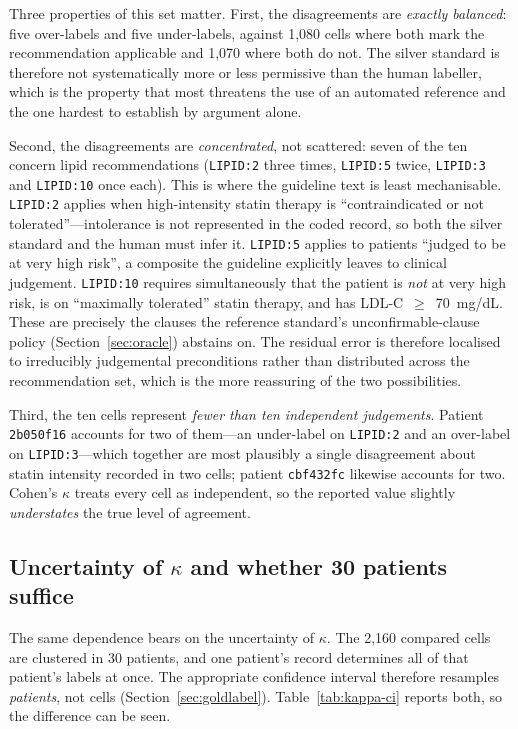 Three properties of this set matter. First, the disagreements are \emph{exactly balanced}:
five over-labels and five under-labels, against 1{,}080 cells where both mark the
recommendation applicable and 1{,}070 where both do not. The silver standard is therefore
not systematically more or less permissive than the human labeller, which is the property
that most threatens the use of an automated reference and the one hardest to establish by
argument alone.

Second, the disagreements are \emph{concentrated}, not scattered: seven of the ten concern
lipid recommendations (\texttt{LIPID:2} three times, \texttt{LIPID:5} twice,
\texttt{LIPID:3} and \texttt{LIPID:10} once each). This is where the guideline text is
least mechanisable. \texttt{LIPID:2} applies when high-intensity statin therapy is
``contraindicated or not tolerated''---intolerance is not represented in the coded record,
so both the silver standard and the human must infer it. \texttt{LIPID:5} applies to
patients ``judged to be at very high risk'', a composite the guideline explicitly leaves
to clinical judgement. \texttt{LIPID:10} requires simultaneously that the patient is
\emph{not} at very high risk, is on ``maximally tolerated'' statin therapy, and has
LDL-C~$\geq$~70~mg/dL. These are precisely the clauses the reference standard's
unconfirmable-clause policy (Section~\ref{sec:oracle}) abstains on. The residual error is
therefore localised to irreducibly judgemental preconditions rather than distributed
across the recommendation set, which is the more reassuring of the two possibilities.

Third, the ten cells represent \emph{fewer than ten independent judgements}. Patient
\texttt{2b050f16} accounts for two of them---an under-label on \texttt{LIPID:2} and an
over-label on \texttt{LIPID:3}---which together are most plausibly a single disagreement
about statin intensity recorded in two cells; patient \texttt{cbf432fc} likewise accounts
for two. Cohen's $\kappa$ treats every cell as independent, so the reported value slightly
\emph{understates} the true level of agreement.

\subsection{Uncertainty of $\kappa$ and whether 30 patients suffice}
\label{sec:kappa-ci}
The same dependence bears on the uncertainty of $\kappa$. The 2{,}160 compared cells are
clustered in 30 patients, and one patient's record determines all of that patient's labels at
once. The appropriate confidence interval therefore resamples \emph{patients}, not cells
(Section~\ref{sec:goldlabel}). Table~\ref{tab:kappa-ci} reports both, so the difference can be
seen.


